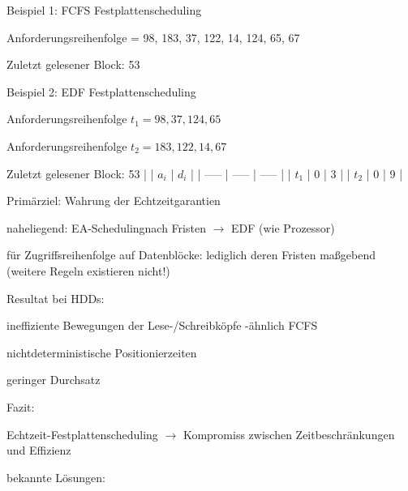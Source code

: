 \documentclass[a4paper]{article}
\begin{document}
\begin{multicols}{3}
    \begin{itemize*}
        \item
        Beispiel 1: FCFS Festplattenscheduling
        \begin{itemize*}
            \item Anforderungsreihenfolge = 98, 183, 37, 122, 14, 124, 65, 67
            \item Zuletzt gelesener Block: 53
        \end{itemize*}
        \item
        Beispiel 2: EDF Festplattenscheduling
        \begin{itemize*}
            \item Anforderungsreihenfolge $t_1 = 98, 37, 124, 65$
            \item Anforderungsreihenfolge $t_2 = 183, 122, 14, 67$
            \item Zuletzt gelesener Block: 53 | | $a_i$ | $d_i$ | | ----- | ----- | ----- | | $t_1$ | 0 | 3 | | $t_2$ | 0 | 9 |
        \end{itemize*}
        \item
        Primärziel: Wahrung der Echtzeitgarantien
        \begin{itemize*}
            \item naheliegend: EA-Schedulingnach Fristen $\rightarrow$ EDF (wie Prozessor)
            \item für Zugriffsreihenfolge auf Datenblöcke: lediglich deren Fristen maßgebend (weitere Regeln existieren nicht!)
        \end{itemize*}
        \item
        Resultat bei HDDs:
        \begin{itemize*}
            \item ineffiziente Bewegungen der Lese-/Schreibköpfe -ähnlich FCFS
            \item nichtdeterministische Positionierzeiten
            \item geringer Durchsatz
        \end{itemize*}
        \item
        Fazit:
        \begin{itemize*}
            \item Echtzeit-Festplattenscheduling $\rightarrow$ Kompromiss zwischen Zeitbeschränkungen und Effizienz
        \end{itemize*}
        \item
        bekannte Lösungen:
        \begin{enumerate*}


\end{enumerate*}
\end{itemize*}
\end{multicols}
\end{document}
